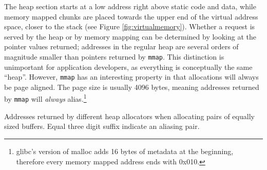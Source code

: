 \documentclass[10pt, conference, compsocconf]{IEEEtran}
\begin{document}
The heap section starts at a low address right above static code and data, while memory mapped chunks are placed towards the upper end of the virtual address space, closer to the stack (see Figure \ref{fig:virtualmemory}).
Whether a request is served by the heap or by memory mapping can be determined by looking at the pointer values returned;
addresses in the regular heap are several orders of magnitude smaller than pointers returned by \texttt{mmap}.
This distinction is unimportant for application developers, as everything is conceptually the same ``heap''.
However, \texttt{mmap} has an interesting property in that allocations will always be page aligned.
The page size is usually 4096 bytes, meaning addresses returned by \texttt{mmap} will \emph{always} alias.\footnote{glibc's version of malloc adds 16 bytes of metadata at the beginning, therefore every memory mapped address ends with 0x010.}

\begin{table}[t]
  \centering
  \caption{Addresses returned by different heap allocators when allocating pairs of equally sized buffers. Equal three digit suffix indicate an aliasing pair.\label{tab:mallocompare}}
\end{table}
\end{document}
